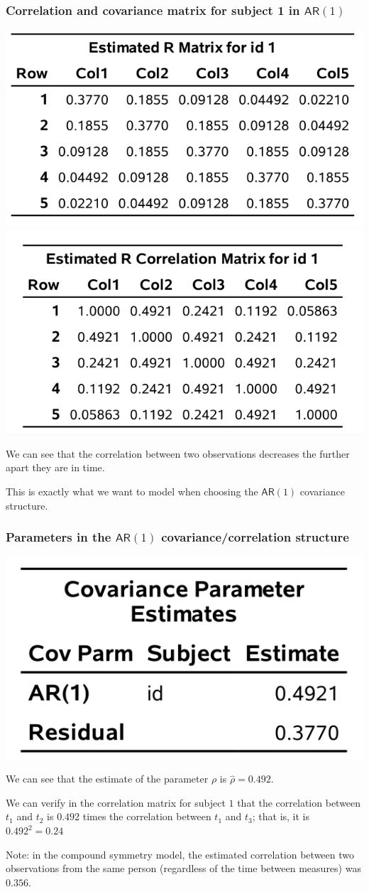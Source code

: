 \documentclass{beamer}
\begin{document}
\begin{frame}[fragile]
\frametitle{Correlation and covariance matrix for subject 1 in $\mathsf{AR}(1)$}
\begin{center}
\includegraphics[width = 0.45\linewidth]{img/c5/slides6-e15a}
\includegraphics[width = 0.45\linewidth]{img/c5/slides6-e15b}
\end{center}
\bi
\item We can see that the correlation between two observations decreases the further apart they are in time. 
\item This is exactly what we want to model when choosing the  $\mathsf{AR}(1)$ covariance structure.
\ei
\end{frame}

\begin{frame}[fragile]
\frametitle{Parameters in the $\mathsf{AR}(1)$ covariance/correlation structure}
\begin{center}
\includegraphics[width = 0.4\linewidth]{img/c5/slides6-e16}
\end{center}
\bi
\item We can see that the estimate of the parameter $\rho$ is $\hat{\rho} =0.492$.
\item We can verify in the correlation matrix for subject $1$ that the correlation between $t_1$ and $t_2$ is $0.492$ times the correlation between $t_1$ and $t_3$; that is, it is $0.492^2=0.24$
\item Note: in the compound symmetry model, the estimated correlation between two observations from the same person (regardless of the time between measures) was $0.356$.

\ei
\end{frame}
\end{document}
